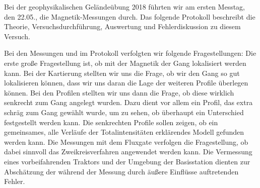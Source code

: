Bei der geophysikalischen Geländeübung 2018 führten wir am ersten Messtag, den 22.05., die Magnetik-Messungen durch. Das folgende Protokoll beschreibt die Theorie, Versuchsdurchführung, Auswertung und Fehlerdiskussion zu diesem Versuch.

Bei den Messungen und im Protokoll verfolgten wir folgende Fragestellungen: Die erste große Fragestellung ist, ob mit der Magnetik der Gang lokalisiert werden kann. Bei der Kartierung stellten wir uns die Frage, ob wir den Gang so gut lokalisieren können, dass wir uns daran die Lage der weiteren Profile überlegen können.
Bei den Profilen stellten wir uns dann die Frage, ob diese wirklich senkrecht zum Gang angelegt wurden. Dazu dient vor allem ein Profil, das extra schräg zum Gang gewählt wurde, um zu sehen, ob überhaupt ein Unterschied festgestellt werden kann. Die senkrechten Profile sollen zeigen, ob ein gemeinsames, alle Verläufe der Totalintensitäten erklärendes Modell gefunden werden kann. Die Messungen mit dem Fluxgate verfolgen die Fragestellung, ob dabei sinnvoll das Zweikreisverfahren angewendet werden kann. Die Vermessung eines vorbeifahrenden Traktors und der Umgebung der Basisstation dienten zur Abschätzung der während der Messung durch äußere Einflüsse auftretenden Fehler.